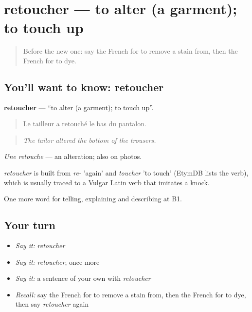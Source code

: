 \section[retoucher]{retoucher — to alter (a garment); to touch up}

\label{lesson:FR-C447-retoucher}



\begin{quote}
Before the new one: say the French for to remove a stain from, then the French for to dye.
\end{quote}

\subsection*{You'll want to know: retoucher}
\textbf{retoucher} — \textquotedblleft{}to alter (a garment); to touch up\textquotedblright{}.

\begin{quote}
Le tailleur a retouché le bas du pantalon.
\end{quote}

\begin{quote}
\emph{The tailor altered the bottom of the trousers.}
\end{quote}

\emph{Une retouche} — an alteration; also on photos.

\begin{cousinweb}
\emph{retoucher} is built from \emph{re-} 'again' and \emph{toucher} 'to touch' (EtymDB lists the verb), which is usually traced to a Vulgar Latin verb that imitates a knock.
\end{cousinweb}

\begin{grammarlens}[title={What you've built}]
One more word for telling, explaining and describing at B1.
\end{grammarlens}

\subsection*{Your turn}
\begin{itemize}
\raggedright
  \item \emph{Say it:} \emph{retoucher}
  \item \emph{Say it:} \emph{retoucher}, once more
  \item \emph{Say it:} a sentence of your own with \emph{retoucher}
  \item \emph{Recall:} say the French for to remove a stain from, then the French for to dye, then say \emph{retoucher} again
\end{itemize}


